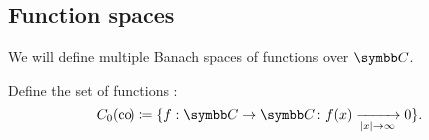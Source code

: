 \subsection{Function spaces}\label{subsec:function_spaces}

\begin{definition}\label{def:function_spaces}
  We will define multiple Banach spaces of functions over \( \C \).

  \begin{defenum}
     Define the set of functions :
    \begin{equation*}
      C_0(\Co) \coloneqq \{ f: \C \to \C \colon f(x) \xrightarrow[\Abs{x} \to \infty]{} 0 \}.
    \end{equation*}
  \end{defenum}
\end{definition}

